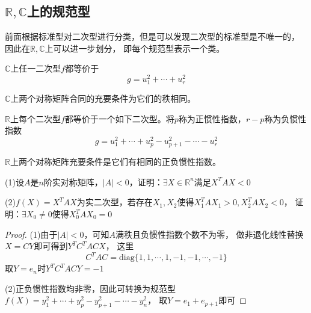 \subsection{$\mathbb{R},\mathbb{C}$上的规范型}

前面根据标准型对二次型进行分类，但是可以发现二次型的标准型是不唯一的，
因此在$\mathbb{R},\mathbb{C}$上可以进一步划分，
即每个规范型表示一个类。

\begin{theorem}
  $\mathbb{C}$上任一二次型$f$都等价于
  \begin{equation*}
    g = u_1^2 + \cdots + u_r^2
  \end{equation*}
\end{theorem}

\begin{corollary}
  $\mathbb{C}$上两个对称矩阵合同的充要条件为它们的秩相同。
\end{corollary}

\begin{theorem}
  $\mathbb{R}$上每个二次型$f$都等价于一个如下二次型。将$p$称为正惯性指数，$r - p$称为负惯性指数
  \begin{equation*}
    g = u_1^2 + \cdots + u_p^2 - u_{p+1}^2 - \cdots - u_r^2
  \end{equation*}
\end{theorem}

\begin{corollary}
  $\mathbb{R}$上两个对称矩阵充要条件是它们有相同的正负惯性指数。
\end{corollary}

\begin{exercise}[规范型的应用]
  (1)设$A$是$n$阶实对称矩阵，$|A| < 0$，证明：$\exists X \in \mathbb{R}^n$满足$X^TAX < 0$

  (2)$f(X) = X^TAX$为实二次型，若存在$X_1,X_2$使得$X_1^TAX_1 > 0, X_2^T AX_2 < 0$，
  证明：$\exists X_0 \neq 0$使得$X_0^TAX_0 = 0$
\end{exercise}

\begin{proof}
  (1)由于$|A| < 0$，可知$A$满秩且负惯性指数个数不为零，
  做非退化线性替换$X = CY$即可得到$Y^TC^TACX$，
  这里
  \begin{equation*}
    C^TAC = \mathrm{diag}\{1,1,\cdots,1,-1,-1,\cdots,-1\}
  \end{equation*}
  取$Y = e_n$时$Y^TC^TACY = -1$

  (2)正负惯性指数均非零，因此可转换为规范型$f(X) = y_1^2 + \cdots +y_p^2 - y_{p+1}^2 - \cdots - y_n^2$，
  取$Y = e_1 + e_{p+1}$即可
\end{proof}


